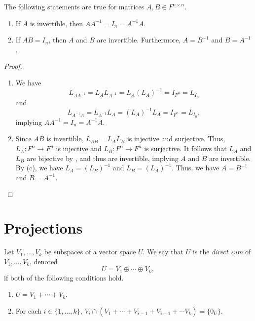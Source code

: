 \begin{proposition}
  \label{prop:invertible-matrix}
  The following statements are true for matrices $A, B \in F^{n \times n}$.
  \begin{enumerate}
    \item If $A$ is invertible, then $AA^{-1} = I_n = A^{-1}A$.
    \item If $AB = I_n$, then $A$ and $B$ are invertible.
    Furthermore, $A = B^{-1}$ and $B = A^{-1}$.
  \end{enumerate}
\end{proposition}
\begin{proof}
  \leavevmode
  \begin{enumerate}
    \item We have
    \begin{equation*}
      L_{AA^{-1}} = L_AL_{A^{-1}} = L_A(L_A)^{-1} = I_{F^n} = L_{I_n}
    \end{equation*}
    and
    \begin{equation*}
      L_{A^{-1}A} = L_{A^{-1}}L_A = (L_A)^{-1}L_A = I_{F^n} = L_{I_n},
    \end{equation*}
    implying $AA^{-1} = I_n = A^{-1}A$.
    
    \item Since $AB$ is invertible, $L_{AB} = L_AL_B$ is injective and
    surjective.
    Thus, ${L_A: F^n \to F^n}$ is injective and ${L_B: F^n \to F^n}$ is
    surjective.
    It follows that $L_A$ and $L_B$ are bijective by ,
    and thus are invertible, implying $A$ and $B$ are invertible.
    By  (c), we have $L_A = (L_B)^{-1}$ and
    $L_B = (L_A)^{-1}$.
    Thus, we have $A = B^{-1}$ and $B = A^{-1}$.
    \qedhere
  \end{enumerate}
\end{proof}

\section{Projections}
\begin{definition}
  \label{def:direct-sum}
  Let $V_1, \dots, V_k$ be subspaces of a vector space $U$.
  We say that $U$ is the \emph{direct sum} of $V_1, \dots, V_k$, denoted
  \begin{equation*}
    U = V_1 \oplus \cdots \oplus V_k,
  \end{equation*}
  if both of the following conditions hold.
  \begin{enumerate}
    \item $U = V_1 + \cdots + V_k$.
    \item For each $i \in \{1, \dots, k\}$,
    $V_i \cap (V_1 + \cdots + V_{i-1} + V_{i+1} + \cdots V_k) = \{0_U\}$.
  \end{enumerate}
\end{definition}

